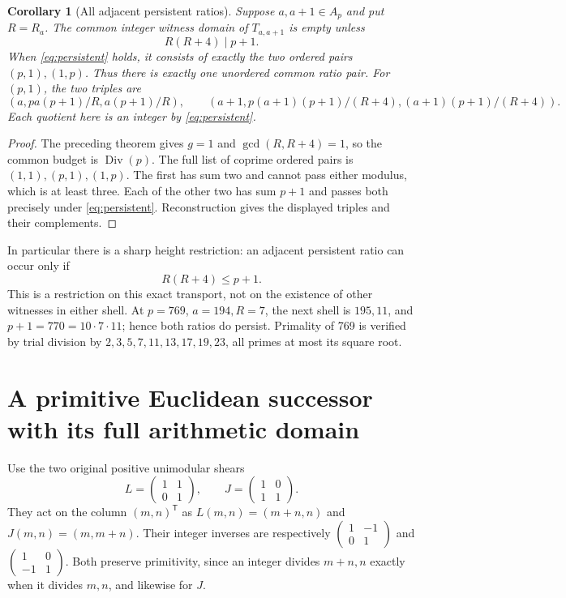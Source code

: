 \documentclass[11pt]{article}
\newtheorem{corollary}[theorem]{Corollary}
\theoremstyle{definition}\newtheorem{definition}[theorem]{Definition}
\theoremstyle{remark}\newtheorem{remark}[theorem]{Remark}
\DeclareMathOperator{\Div}{Div}
\begin{document}
\begin{corollary}[All adjacent persistent ratios]\label{cor:adjacent}
Suppose \(a,a+1\in A_p\) and put \(R=R_a\).  The common integer
witness domain of \(T_{a,a+1}\) is empty unless
\begin{equation}\label{eq:persistent}
 R(R+4)\mid p+1.
\end{equation}
When \eqref{eq:persistent} holds, it consists of exactly the two
ordered pairs \((p,1),(1,p)\).  Thus there is exactly one
unordered common ratio pair.  For \((p,1)\), the two triples are
\[
 (a,pa(p+1)/R,a(p+1)/R),\qquad
 (a+1,p(a+1)(p+1)/(R+4),(a+1)(p+1)/(R+4)).
\]
Each quotient here is an integer by \eqref{eq:persistent}.
\end{corollary}
\begin{proof}
The preceding theorem gives \(g=1\) and
\(\gcd(R,R+4)=1\), so the common budget is \(\Div(p)\).
The full list of coprime ordered pairs is
\((1,1),(p,1),(1,p)\).  The first has sum two and cannot pass
either modulus, which is at least three.  Each of the other
two has sum \(p+1\) and passes both precisely under
\eqref{eq:persistent}.  Reconstruction gives the displayed
triples and their complements.
\end{proof}

In particular there is a sharp height restriction:
an adjacent persistent ratio can occur only if
\[
 R(R+4)\le p+1.
\]
This is a restriction on this exact transport, not on the
existence of other witnesses in either shell.  At \(p=769\),
\(a=194,R=7\), the next shell is \(195,11\), and
\(p+1=770=10\cdot7\cdot11\); hence both ratios do persist.
Primality of 769 is verified by trial division by
\(2,3,5,7,11,13,17,19,23\), all primes at most its square root.

\section{A primitive Euclidean successor with its full arithmetic domain}

Use the two original positive unimodular shears
\[
 L=\begin{pmatrix}1&1\\0&1\end{pmatrix},\qquad
 J=\begin{pmatrix}1&0\\1&1\end{pmatrix}.
\]
They act on the column \((m,n)^{\mathsf T}\) as
\(L(m,n)=(m+n,n)\) and \(J(m,n)=(m,m+n)\).  Their integer
inverses are respectively
\(\left(\begin{smallmatrix}1&-1\\0&1\end{smallmatrix}\right)\)
and \(\left(\begin{smallmatrix}1&0\\-1&1\end{smallmatrix}\right)\).
Both preserve primitivity, since an integer divides
\(m+n,n\) exactly when it divides \(m,n\), and likewise for \(J\).
\end{document}
